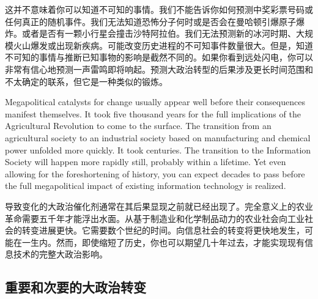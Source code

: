 \begin{paracol}{2}
\switchcolumn
这并不意味着你可以知道不可知的事情。我们不能告诉你如何预测中奖彩票号码或任何真正的随机事件。我们无法知道恐怖分子何时或是否会在曼哈顿引爆原子爆炸。或者是否有一颗小行星会撞击沙特阿拉伯。我们无法预测新的冰河时期、大规模火山爆发或出现新疾病。可能改变历史进程的不可知事件数量很大。但是，知道不可知的事情与推断已知事物的影响是截然不同的。如果你看到远处闪电，你可以非常有信心地预测一声雷鸣即将响起。预测大政治转型的后果涉及更长时间范围和不太确定的联系，但它是一种类似的锻炼。

\switchcolumn*
Megapolitical catalysts for change usually appear well before their consequences manifest themselves. It took five thousand years for the full implications of the Agricultural Revolution to come to the surface. The transition from an agricultural society to an industrial society based on manufacturing and chemical power unfolded more quickly. It took centuries. The transition to the Information Society will happen more rapidly still, probably within a lifetime. Yet even allowing for the foreshortening of history, you can expect decades to pass before the full megapolitical impact of existing information technology is realized.

\switchcolumn
导致变化的大政治催化剂通常在其后果显现之前就已经出现了。完全意义上的农业革命需要五千年才能浮出水面。从基于制造业和化学制品动力的农业社会向工业社会的转变进展更快。它需要数个世纪的时间。向信息社会的转变将更快地发生，可能在一生内。然而，即使缩短了历史，你也可以期望几十年过去，才能实现现有信息技术的完整大政治影响。

\end{paracol}

\subsection{重要和次要的大政治转变}

